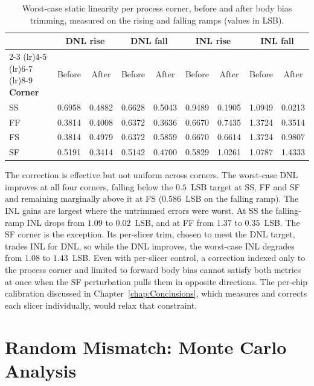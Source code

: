 \begin{table}[htbp]
    \centering
    \caption{Worst-case static linearity per process corner, before and after body bias trimming, measured on the rising and falling ramps (values in LSB).}
    \label{tab:static_linearity_summary}
    \renewcommand{\arraystretch}{1.3}
    \small
    \begin{tabular}{lcccccccc}
        \toprule
        & \multicolumn{2}{c}{\textbf{DNL rise}} & \multicolumn{2}{c}{\textbf{DNL fall}} & \multicolumn{2}{c}{\textbf{INL rise}} & \multicolumn{2}{c}{\textbf{INL fall}} \\
        \cmidrule(lr){2-3} \cmidrule(lr){4-5} \cmidrule(lr){6-7} \cmidrule(lr){8-9}
        \textbf{Corner} & Before & After & Before & After & Before & After & Before & After \\
        \midrule
        SS & 0.6958 & 0.4882 & 0.6628 & 0.5043 & 0.9489 & 0.1905 & 1.0949 & 0.0213 \\
        FF & 0.3814 & 0.4008 & 0.6372 & 0.3636 & 0.6670 & 0.7435 & 1.3724 & 0.3514 \\
        FS & 0.3814 & 0.4979 & 0.6372 & 0.5859 & 0.6670 & 0.6614 & 1.3724 & 0.9807 \\
        SF & 0.5191 & 0.3414 & 0.5142 & 0.4700 & 0.5829 & 1.0261 & 1.0787 & 1.4333 \\
        \bottomrule
    \end{tabular}
\end{table}

The correction is effective but not uniform across corners. The worst-case DNL improves at all four corners, falling below the $0.5$~LSB target at SS, FF and SF and remaining marginally above it at FS ($0.586$~LSB on the falling ramp). The INL gains are largest where the untrimmed errors were worst. At SS the falling-ramp INL drops from $1.09$ to $0.02$~LSB, and at FF from $1.37$ to $0.35$~LSB. The SF corner is the exception. Its per-slicer trim, chosen to meet the DNL target, trades INL for DNL, so while the DNL improves, the worst-case INL degrades from $1.08$ to $1.43$~LSB. Even with per-slicer control, a correction indexed only to the process corner and limited to forward body bias cannot satisfy both metrics at once when the SF perturbation pulls them in opposite directions. The per-chip calibration discussed in Chapter~\ref{chap:Conclusions}, which measures and corrects each slicer individually, would relax that constraint.

 

\section{Random Mismatch: Monte Carlo Analysis}
\label{sec:mc_mismatch}


